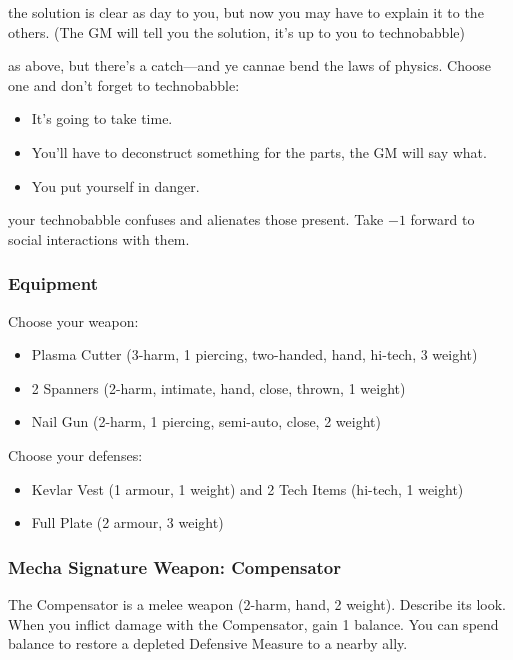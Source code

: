 {the solution is clear as day to you, but now you may have to explain it to the others. (The GM will tell you the solution, it's up to you to technobabble)}
{as above, but there's a catch---and ye cannae bend the laws of physics. Choose one and don't forget to technobabble:
\begin{itemize}
\item It's going to take time.
\item You’ll have to deconstruct something for the parts, the GM will say what.
\item You put yourself in danger.
\end{itemize}}
{your technobabble confuses and alienates those present. Take $-1$ forward to social interactions with them.}


\subsubsection{Equipment}
Choose your weapon:
\begin{itemize}
\item Plasma Cutter (3-harm, 1 piercing, two-handed, hand, hi-tech, 3 weight)
\item 2 Spanners (2-harm, intimate, hand, close, thrown, 1 weight)
\item Nail Gun (2-harm, 1 piercing, semi-auto, close, 2 weight)
\end{itemize}

Choose your defenses:
\begin{itemize}
\item Kevlar Vest (1 armour, 1 weight) and 2 Tech Items (hi-tech, 1 weight)
\item Full Plate (2 armour, 3 weight)
\end{itemize}

\subsubsection{Mecha Signature Weapon: Compensator}
The Compensator is a melee weapon (2-harm, hand, 2 weight). Describe its look.
When you inflict damage with the Compensator, gain 1 balance. You can spend balance to restore a depleted Defensive Measure to a nearby ally.

